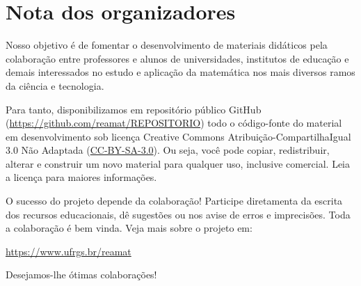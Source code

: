 
\chapter*{Nota dos organizadores}

Nosso objetivo é de fomentar o desenvolvimento de materiais didáticos pela colaboração entre professores e alunos de universidades, institutos de educação e demais interessados no estudo e aplicação da matemática nos mais diversos ramos da ciência e tecnologia.

Para tanto, disponibilizamos em repositório público GitHub (\url{https://github.com/reamat/REPOSITORIO}) todo o código-fonte do material em desenvolvimento sob licença Creative Commons Atribuição-CompartilhaIgual 3.0 Não Adaptada (\href{https://creativecommons.org/licenses/by-sa/3.0/}{CC-BY-SA-3.0}). Ou seja, você pode copiar, redistribuir, alterar e construir um novo material para qualquer uso, inclusive comercial. Leia a licença para maiores informações.

O sucesso do projeto depende da colaboração! Participe diretamenta da escrita dos recursos educacionais, dê sugestões ou nos avise de erros e imprecisões. Toda a colaboração é bem vinda. Veja mais sobre o projeto em:
\begin{center}
  \url{https://www.ufrgs.br/reamat}
\end{center}

\vspace{0.5cm}

Desejamos-lhe ótimas colaborações!
